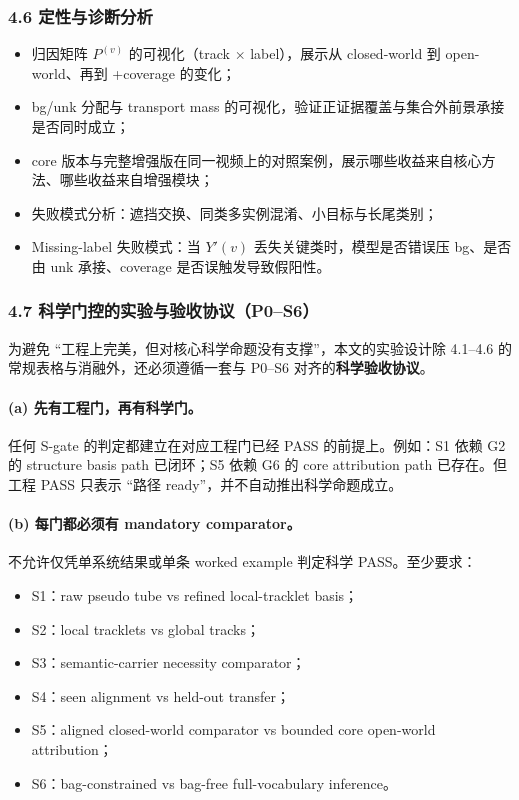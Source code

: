 \documentclass[UTF8]{ctexart}
\begin{document}
\subsubsection*{4.6 定性与诊断分析}
\begin{itemize}
\item 归因矩阵 $P^{(v)}$ 的可视化（track $\times$ label），展示从 closed-world 到 open-world、再到 +coverage 的变化；
\item bg/unk 分配与 transport mass 的可视化，验证正证据覆盖与集合外前景承接是否同时成立；
\item core 版本与完整增强版在同一视频上的对照案例，展示哪些收益来自核心方法、哪些收益来自增强模块；
\item 失败模式分析：遮挡交换、同类多实例混淆、小目标与长尾类别；
\item Missing-label 失败模式：当 $Y'(v)$ 丢失关键类时，模型是否错误压 bg、是否由 unk 承接、coverage 是否误触发导致假阳性。
\end{itemize}


\subsubsection*{4.7 科学门控的实验与验收协议（P0--S6）}
为避免 ``工程上完美，但对核心科学命题没有支撑''，本文的实验设计除 4.1--4.6 的常规表格与消融外，还必须遵循一套与 P0--S6 对齐的\textbf{科学验收协议}。

\paragraph{(a) 先有工程门，再有科学门。}
任何 S-gate 的判定都建立在对应工程门已经 PASS 的前提上。例如：S1 依赖 G2 的 structure basis path 已闭环；S5 依赖 G6 的 core attribution path 已存在。但工程 PASS 只表示 ``路径 ready''，并不自动推出科学命题成立。

\paragraph{(b) 每门都必须有 mandatory comparator。}
不允许仅凭单系统结果或单条 worked example 判定科学 PASS。至少要求：
\begin{itemize}
\item S1：raw pseudo tube vs refined local-tracklet basis；
\item S2：local tracklets vs global tracks；
\item S3：semantic-carrier necessity comparator；
\item S4：seen alignment vs held-out transfer；
\item S5：aligned closed-world comparator vs bounded core open-world attribution；
\item S6：bag-constrained vs bag-free full-vocabulary inference。
\end{itemize}
\end{document}
